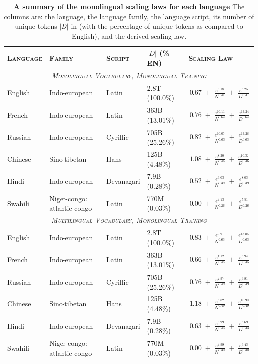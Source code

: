 \begin{table}
\centering            %
\scriptsize         %
\setlength{\tabcolsep}{3pt}
\caption{\textbf{A summary of the monolingual scaling laws for each language}
The columns are: the language, the language family, the language script, its number of unique tokens $|D|$ in \madlad{} (with the percentage of unique tokens as compared to English), and the derived scaling law. 
}
\begin{tabular}{l|lll|l}
\toprule
\textsc{Language} & \textsc{Family} & \textsc{Script} & \textsc{$|D|$ (\% EN)} &
\textsc{Scaling Law} \\
\midrule
\multicolumn{5}{c}{\textsc{\emph{Monolingual Vocabulary, Monolingual Training}}} \\
\midrule
      
English & Indo-european & Latin & 2.8T (100.0\%) & $\,0.67\;+\;\frac{e^{6.18}}{N^{0.41}}\;+\;\frac{e^{8.25}}{D^{0.41}}\,$ \\[2mm]
French & Indo-european & Latin & 363B (13.01\%) & $\,0.76\;+\;\frac{e^{10.11}}{N^{0.64}}\;+\;\frac{e^{13.24}}{D^{0.64}}\,$ \\[2mm]
Russian & Indo-european & Cyrillic & 705B (25.26\%) & $\,0.82\;+\;\frac{e^{10.07}}{N^{0.63}}\;+\;\frac{e^{13.28}}{D^{0.63}}\,$ \\[2mm]
Chinese & Sino-tibetan & Hans & 125B (4.48\%) & $\,1.08\;+\;\frac{e^{8.20}}{N^{0.46}}\;+\;\frac{e^{10.37}}{D^{0.46}}\,$ \\[2mm]
Hindi & Indo-european & Devanagari & 7.9B (0.28\%) & $\,0.52\;+\;\frac{e^{6.03}}{N^{0.39}}\;+\;\frac{e^{8.03}}{D^{0.39}}\,$ \\[2mm]
Swahili & Niger-congo: atlantic congo & Latin & 770M (0.03\%) & $\,0.00\;+\;\frac{e^{4.13}}{N^{0.26}}\;+\;\frac{e^{5.51}}{D^{0.26}}\,$ \\[2mm]


\midrule
\multicolumn{5}{c}{\textsc{\emph{Multilingual Vocabulary, Monolingual Training}}} \\
\midrule

English & Indo-european & Latin & 2.8T (100.0\%) & $\,0.83\;+\;\frac{e^{9.91}}{N^{0.63}}\;+\;\frac{e^{13.06}}{D^{0.63}}\,$ \\[2mm]
French & Indo-european & Latin & 363B (13.01\%) & $\,0.66\;+\;\frac{e^{7.12}}{N^{0.45}}\;+\;\frac{e^{8.94}}{D^{0.45}}\,$ \\[2mm]
Russian & Indo-european & Cyrillic & 705B (25.26\%) & $\,0.76\;+\;\frac{e^{7.97}}{N^{0.49}}\;+\;\frac{e^{9.91}}{D^{0.49}}\,$ \\[2mm]
Chinese & Sino-tibetan & Hans & 125B (4.48\%) & $\,1.18\;+\;\frac{e^{8.87}}{N^{0.49}}\;+\;\frac{e^{10.90}}{D^{0.49}}\,$ \\[2mm]
Hindi & Indo-european & Devanagari & 7.9B (0.28\%) & $\,0.63\;+\;\frac{e^{6.99}}{N^{0.43}}\;+\;\frac{e^{8.69}}{D^{0.43}}\,$ \\[2mm]
Swahili & Niger-congo: atlantic congo & Latin & 770M (0.03\%) & $\,0.00\;+\;\frac{e^{4.99}}{N^{0.30}}\;+\;\frac{e^{6.43}}{D^{0.30}}\,$ \\[2mm]


\end{tabular}
\end{table}
